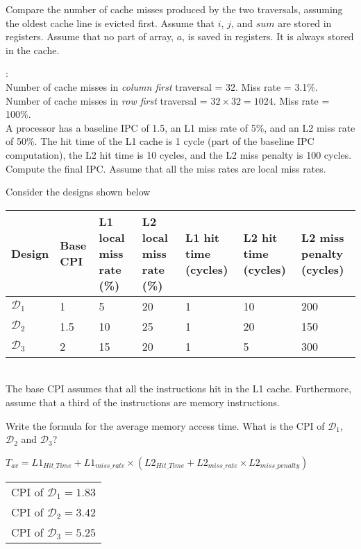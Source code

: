 \begin{ExerciseList}
Compare the number of cache misses produced by the two traversals, assuming the
oldest cache line is evicted first. Assume that $i$, $j$, and $sum$ are stored
in registers. Assume that no part of array, $a$, is saved in registers. It is
always stored in the cache.

\Answer:\\
Number of cache misses in {\em column first} traversal = 32. Miss rate = 3.1\%. \\
Number of cache misses in {\em row first} traversal = $32 \times 32 = 1024$. Miss rate = 100\%.\\ 

\Exercise
A processor has a baseline IPC of 1.5, an L1 miss rate of 5\%, and an L2 miss rate of 50\%. The hit time
of the L1 cache is 1 cycle (part of the baseline IPC computation), the L2 hit time is 10 cycles, and the L2 miss
penalty is 100 cycles. Compute the final IPC. Assume that all the miss rates are local miss rates.
\Answer


\Exercise Consider the designs shown below 

\begin{tabular}{||l|l|p{15mm}|p{15mm}|p{14mm}|p{15mm}|p{15mm}||}
\hline
\hline
Design & Base CPI & L1 local miss rate (\%) & L2 local miss rate (\%) & L1 hit time (cycles) & 
		L2 hit time (cycles) & L2 miss penalty (cycles)\\
\hline
$\mathcal{D}_1$ & 1 & 5 & 20 & 1 & 10 & 200 \\
\hline
$\mathcal{D}_2$ & 1.5 & 10 & 25 & 1 & 20 & 150 \\
\hline
$\mathcal{D}_3$ & 2 & 15 & 20 & 1 & 5 & 300 \\
\hline
\hline
\end{tabular} \\


The base CPI assumes that all the instructions hit in the L1 cache.
Furthermore, assume that a third of the instructions are memory instructions. 

Write the formula for the average memory access time.
What is the CPI of $\mathcal{D}_1$, $\mathcal{D}_2$ and $\mathcal{D}_3$?


\Answer
$T_{av} = L1_{Hit\_Time} + L1_{miss\_rate} \times \left ( L2_{Hit\_Time} + L2_{miss\_rate}\times L2_{miss\_penalty} \right )$
\begin{tabular}{c}
CPI of $\mathcal{D}_1=1.83$  \\
CPI of $\mathcal{D}_2=3.42$ \\
CPI of $\mathcal{D}_3=5.25$  \\
\end{tabular}



\end{ExerciseList}
